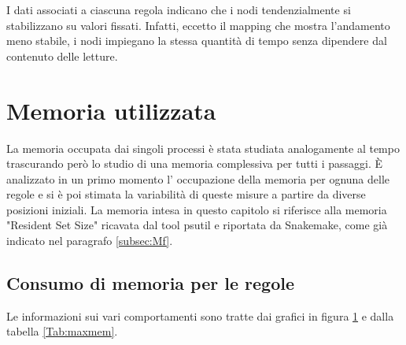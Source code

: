 I dati associati a ciascuna regola indicano che i nodi tendenzialmente si stabilizzano su valori fissati.
Infatti, eccetto il mapping che mostra l'andamento meno stabile, i nodi impiegano la stessa quantità di tempo senza dipendere dal contenuto delle letture. 


\section{Memoria utilizzata}
La memoria occupata dai singoli processi è stata studiata analogamente al tempo trascurando però lo studio di una memoria complessiva per tutti i passaggi. 
È analizzato in un primo momento l' occupazione della memoria per ognuna delle regole e si è poi stimata la variabilità di queste misure a partire da diverse posizioni iniziali.
La memoria intesa in questo capitolo si riferisce alla memoria "Resident Set Size" ricavata dal tool psutil e riportata da Snakemake, come già indicato nel paragrafo \ref{subsec:Mf}. 

\subsection{Consumo di memoria per le regole}
Le informazioni sui vari comportamenti sono tratte dai grafici in figura \ref{fig:RSSr} e dalla tabella \ref{Tab:maxmem}.
\begin{figure}[H]
\centering
{} \quad
{} \\
\end{figure}
\begin{figure}[H]
\ContinuedFloat
\centering
{} \quad
{} \\
\end{figure}
\begin{figure}[H]
\ContinuedFloat
\centering
{} 
\caption{}
\label{fig:RSSr}
\end{figure}

